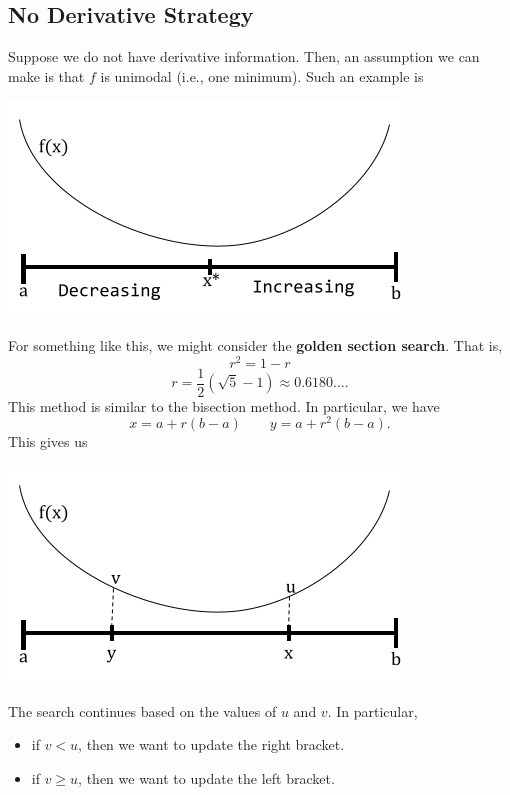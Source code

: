 \documentclass[letterpaper]{article}
\begin{document}
\subsection{No Derivative Strategy}
Suppose we do not have derivative information. Then, an assumption we can make is that $f$ is unimodal (i.e., one minimum). Such an example is 
\begin{center}
    \includegraphics[scale=0.5]{../assets/no_deriv_fx.png}
\end{center}
For something like this, we might consider the \textbf{golden section search}. That is, 
\[r^2 = 1 - r\]
\[r = \frac{1}{2} \left(\sqrt{5} - 1\right) \approx 0.6180\hdots.\]
This method is similar to the bisection method. In particular, we have 
\[x = a + r(b - a) \qquad y = a + r^2 (b - a).\]
This gives us 
\begin{center}
    \includegraphics[scale=0.5]{../assets/no_deriv_fx1.png}
\end{center}
The search continues based on the values of $u$ and $v$. In particular, 
\begin{itemize}
    \item if $v < u$, then we want to update the right bracket.
    \item if $v \geq u$, then we want to update the left bracket.
\end{itemize}
\end{document}
